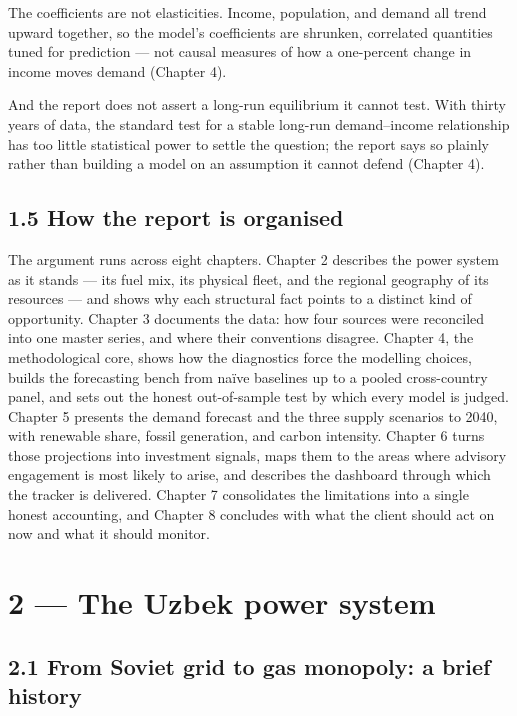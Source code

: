 \documentclass[10pt,twocolumn]{article}
\begin{document}
The coefficients are not elasticities. Income, population, and demand all trend upward together, so the model's coefficients are shrunken, correlated quantities tuned for prediction --- not causal measures of how a one-percent change in income moves demand (Chapter 4).

And the report does not assert a long-run equilibrium it cannot test. With thirty years of data, the standard test for a stable long-run demand--income relationship has too little statistical power to settle the question; the report says so plainly rather than building a model on an assumption it cannot defend (Chapter 4).

\subsection*{1.5 How the report is organised}

The argument runs across eight chapters. Chapter 2 describes the power system as it stands --- its fuel mix, its physical fleet, and the regional geography of its resources --- and shows why each structural fact points to a distinct kind of opportunity. Chapter 3 documents the data: how four sources were reconciled into one master series, and where their conventions disagree. Chapter 4, the methodological core, shows how the diagnostics force the modelling choices, builds the forecasting bench from naïve baselines up to a pooled cross-country panel, and sets out the honest out-of-sample test by which every model is judged. Chapter 5 presents the demand forecast and the three supply scenarios to 2040, with renewable share, fossil generation, and carbon intensity. Chapter 6 turns those projections into investment signals, maps them to the areas where advisory engagement is most likely to arise, and describes the dashboard through which the tracker is delivered. Chapter 7 consolidates the limitations into a single honest accounting, and Chapter 8 concludes with what the client should act on now and what it should monitor.

\section*{2 --- The Uzbek power system}

\subsection*{2.1 From Soviet grid to gas monopoly: a brief history}
\end{document}
